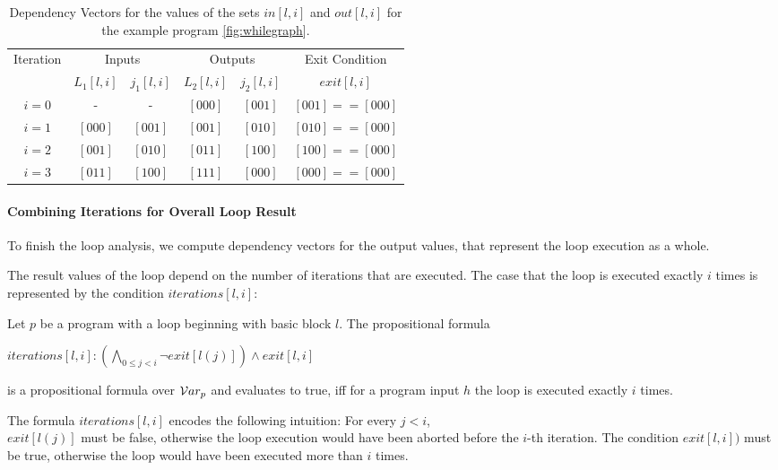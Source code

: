 \begin{table}
    \centering
    \begin{tabular}{|c|c|c|c|c|c|}
    Iteration & \multicolumn{2}{|c|}{Inputs} & \multicolumn{2}{|c|}{Outputs} & Exit Condition \\
     & $L_1[l, i]$ & $j_1[l, i]$ & $L_2[l, i]$ & $j_2[l, i]$ & $exit[l, i]$ \\
     \hline
     $i = 0$ & - & - & $[0 0 0]$ & $[0 0 1]$ & $[001] == [000]$ \\
     $i = 1$ & $[0 0 0]$ & $[0 0 1]$ & $[0 0 1]$ & $[0 1 0]$ & $[010] == [000]$ \\
     $i = 2$ & $[0 0 1]$ & $[0 1 0]$ & $[0 1 1]$ & $[1 0 0]$ & $[100] == [000]$ \\
     $i = 3$ & $[0 1 1]$ & $[1 0 0]$ & $[1 1 1]$ & $[0 0 0]$ & $[000] == [000]$ \\
    \end{tabular}
    \caption{Dependency Vectors for the values of the sets $in[l, i]$ and $out[l, i]$ for the example program \ref{fig:whilegraph}.}
    \label{tab:loop}
\end{table}

\paragraph{Combining Iterations for Overall Loop Result}
To finish the loop analysis, we compute dependency vectors for the output values, that represent the loop execution as a whole.

The result values of the loop depend on the number of iterations that are executed. The case that the loop is executed exactly $i$ times is represented by the condition $iterations[l, i]$:

\begin{definition}
    Let $p$ be a program with a loop beginning with basic block $l$.
    The propositional formula
    \begin{center}
        $iterations[l, i]: (\bigwedge\limits_{0 \leq j < i} \lnot exit[l(j)]) \land exit[l, i]$
    \end{center}
    is a propositional formula over $\mathcal{V}ar_p$ and evaluates to true, iff for a program input $h$ the loop is executed exactly $i$ times.
\end{definition}

The formula $iterations[l, i]$ encodes the following intuition: For every $j < i$, \\$exit[l(j)]$ must be false, otherwise the loop execution would have been aborted before the $i$-th iteration. The condition $exit[l, i])$ must be true, otherwise the loop would have been executed more than $i$ times.

